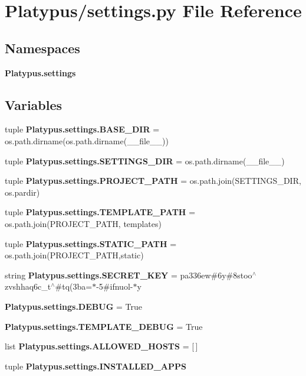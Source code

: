 \section{Platypus/settings.py File Reference}
\label{settings_8py}
\subsection*{Namespaces}
\begin{DoxyCompactItemize}
\item 
 {\bf Platypus.\+settings}
\end{DoxyCompactItemize}
\subsection*{Variables}
\begin{DoxyCompactItemize}
\item 
tuple {\bf Platypus.\+settings.\+B\+A\+S\+E\+\_\+\+D\+I\+R} = os.\+path.\+dirname(os.\+path.\+dirname(\+\_\+\+\_\+file\+\_\+\+\_\+))
\item 
tuple {\bf Platypus.\+settings.\+S\+E\+T\+T\+I\+N\+G\+S\+\_\+\+D\+I\+R} = os.\+path.\+dirname(\+\_\+\+\_\+file\+\_\+\+\_\+)
\item 
tuple {\bf Platypus.\+settings.\+P\+R\+O\+J\+E\+C\+T\+\_\+\+P\+A\+T\+H} = os.\+path.\+join(S\+E\+T\+T\+I\+N\+G\+S\+\_\+\+D\+I\+R, os.\+pardir)
\item 
tuple {\bf Platypus.\+settings.\+T\+E\+M\+P\+L\+A\+T\+E\+\_\+\+P\+A\+T\+H} = os.\+path.\+join(P\+R\+O\+J\+E\+C\+T\+\_\+\+P\+A\+T\+H, \textquotesingle{}templates\textquotesingle{})
\item 
tuple {\bf Platypus.\+settings.\+S\+T\+A\+T\+I\+C\+\_\+\+P\+A\+T\+H} = os.\+path.\+join(P\+R\+O\+J\+E\+C\+T\+\_\+\+P\+A\+T\+H,\textquotesingle{}static\textquotesingle{})
\item 
string {\bf Platypus.\+settings.\+S\+E\+C\+R\+E\+T\+\_\+\+K\+E\+Y} = \textquotesingle{}pa336ew\#6y\#8stoo$^\wedge$zvshhaq6c\+\_\+t$^\wedge$\#tq(3ba=$\ast$-\/5\#ifnuol-\/$\ast$y\textquotesingle{}
\item 
{\bf Platypus.\+settings.\+D\+E\+B\+U\+G} = True
\item 
{\bf Platypus.\+settings.\+T\+E\+M\+P\+L\+A\+T\+E\+\_\+\+D\+E\+B\+U\+G} = True
\item 
list {\bf Platypus.\+settings.\+A\+L\+L\+O\+W\+E\+D\+\_\+\+H\+O\+S\+T\+S} = [$\,$]
\item 
tuple {\bf Platypus.\+settings.\+I\+N\+S\+T\+A\+L\+L\+E\+D\+\_\+\+A\+P\+P\+S}

\end{DoxyCompactItemize}
